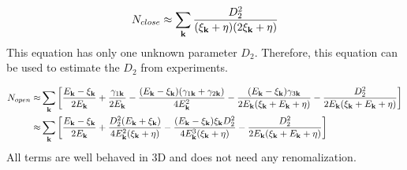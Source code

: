 \begin{equation}
N_{close}\approx\sum_{\mathbf{k}}\frac{D_{2}^2}{(\xi_{\mathbf{k}}+\eta)(2\xi_{\mathbf{k}}+\eta)}
\end{equation}
This equation has only one unknown parameter $D_{2}$.  Therefore, this equation can be used to estimate the $D_{2}$ from experiments.  



\begin{equation}
\begin{split}
N_{open}\approx&\sum_{\mathbf{k}}\left[\frac{E_{\mathbf{k}}-\xi_{\mathbf{k}}}{2E_{\mathbf{k}}}+\frac{\gamma_{1\mathbf{k}}}{2E_{\mathbf{k}}}
	-\frac{(E_{\mathbf{k}}-\xi_{\mathbf{k}})(\gamma_{1\mathbf{k}}+\gamma_{2\mathbf{k}})}{4E_{\mathbf{k}}^2}
	-\frac{(E_{\mathbf{k}}-\xi_{\mathbf{k}})\gamma_{3\mathbf{k}}}{2E_{\mathbf{k}}(\xi_{\mathbf{k}}+E_{\mathbf{k}}+\eta)}
	-\frac{D_{2}^{2}}{2E_{\mathbf{k}}(\xi_{\mathbf{k}}+E_{\mathbf{k}}+\eta)}\right]\\
	\approx&\sum_{\mathbf{k}}\left[\frac{E_{\mathbf{k}}-\xi_{\mathbf{k}}}{2E_{\mathbf{k}}}+\frac{{D_{2}^{2}(E_{\mathbf{k}}+\xi_{\mathbf{k}})}}{4E_{\mathbf{k}}^{2}(\xi_{\mathbf{k}}+\eta)}
	-\frac{(E_{\mathbf{k}}-\xi_{\mathbf{k}})\xi_{\mathbf{k}}D_{2}^{2}}{4E_{\mathbf{k}}^3(\xi_{\mathbf{k}}+\eta)}
	-\frac{D_{2}^{2}}{2E_{\mathbf{k}}(\xi_{\mathbf{k}}+E_{\mathbf{k}}+\eta)}\right]	
\end{split}
\end{equation}
All terms are well behaved in 3D and does not need any renomalization. 
%

